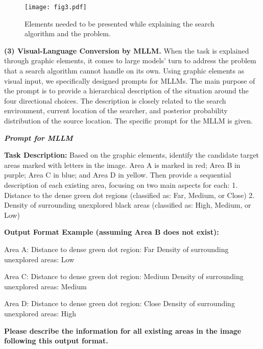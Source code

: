 \begin{figure}[htbp]
    \centering
    \texttt{[image: fig3.pdf]}
    \caption{Elements needed to be presented while explaining the search algorithm and the problem.}
    \label{fig:explanation}
\end{figure}

\textbf{(3) Visual-Language Conversion by MLLM.}
When the task is explained through graphic elements, it comes to large models' turn to address the problem that a search algorithm cannot handle on its own. Using graphic elements as visual input, we specifically designed prompts for MLLMs. The main purpose of the prompt is to provide a hierarchical description of the situation around the four directional choices. The description is closely related to the search environment, current location of the searcher, and posterior probability distribution of the source location. The specific prompt for the MLLM is given.

\begin{center}
\begin{minipage}{\linewidth}
\begin{shaded}
\textit{\textbf{Prompt for MLLM}}

\textbf{Task Description:}  
Based on the graphic elements, identify the candidate target areas marked with letters in the image. Area A is marked in red; Area B in purple; Area C in blue; and Area D in yellow. Then provide a sequential description of each existing area, focusing on two main aspects for each:  
1. Distance to the dense green dot regions (classified as: Far, Medium, or Close)  
2. Density of surrounding unexplored black areas (classified as: High, Medium, or Low)  

\textbf{Output Format Example (assuming Area B does not exist):}  

Area A:  
Distance to dense green dot region: Far  
Density of surrounding unexplored areas: Low  

Area C:  
Distance to dense green dot region: Medium  
Density of surrounding unexplored areas: Medium  

Area D:  
Distance to dense green dot region: Close  
Density of surrounding unexplored areas: High  
  

\textbf{Please describe the information for all existing areas in the image following this output format.}
\end{shaded}
\end{minipage}
\end{center}

